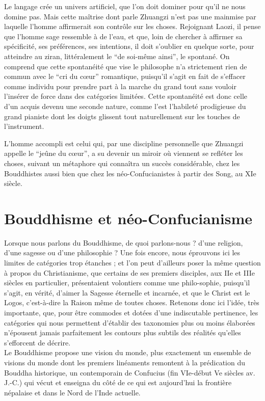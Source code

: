 \documentclass[11pt,a4paper]{article} %
\begin{document}
Le langage crée un univers artificiel, que l'on doit dominer pour qu'il ne nous domine pas.
Mais cette maîtrise dont parle Zhuangzi n'est pas une mainmise par laquelle l'homme
affirmerait son contrôle sur les choses.
Rejoignant Laozi, il pense que l'homme sage ressemble à de l'eau, et que, loin de chercher à affirmer sa spécificité, ses préférences, ses
intentions, il doit s'oublier en quelque sorte, pour atteindre au ziran, littéralement le ``de
soi-même ainsi'', le spontané.
On comprend que cette spontanéité que vise le philosophe
n'a strictement rien de commun avec le ``cri du cœur'' romantique, puisqu'il s'agit en fait
de s'effacer comme individu pour prendre part à la marche du grand tout sans vouloir
l'insérer de force dans des catégories limitées.
Cette spontanéité est donc celle d'un acquis
devenu une seconde nature, comme l'est l'habileté prodigieuse du grand pianiste dont les
doigts glissent tout naturellement sur les touches de l'instrument.

L'homme accompli est celui qui, par une discipline personnelle que Zhuangzi appelle le
``jeûne du cœur'', a su devenir un miroir où viennent se refléter les choses, suivant un métaphore qui connaîtra un succès considérable, chez les Bouddhistes aussi bien
que chez les néo-Confucianistes à partir des Song, au XIe siècle.

\part{Bouddhisme et néo-Confucianisme}

Lorsque nous parlons du Bouddhisme, de quoi parlons-nous ? d'une religion, d'une sagesse ou d'une philosophie ? Une fois encore, nous éprouvons ici les limites de
catégories trop étanches ; et l'on peut d'ailleurs poser la même question à propos du
Christianisme, que certains de ses premiers disciples, aux IIe et IIIe siècles en particulier, présentaient volontiers comme une philo-sophie, puisqu'il s'agit, en vérité, d'aimer
la Sagesse éternelle et incarnée, et que le Christ est le Logos, c'est-à-dire la Raison
même de toutes choses.
Retenons donc ici l'idée, très importante, que, pour être commodes et dotées d'une indiscutable pertinence, les catégories qui nous permettent
d'établir des taxonomies plus ou moins élaborées n'épousent jamais parfaitement les
contours plus subtils des réalités qu'elles s'efforcent de décrire.\\

Le Bouddhisme propose une vision du monde, plus exactement un ensemble de visions
du monde dont les premiers linéaments remontent à la prédication du Bouddha historique, un contemporain de Confucius (fin VIe-début Ve siècles av. J.-C.) qui vécut et
enseigna du côté de ce qui est aujourd'hui la frontière népalaise et dans le Nord de
l'Inde actuelle.
\end{document}
